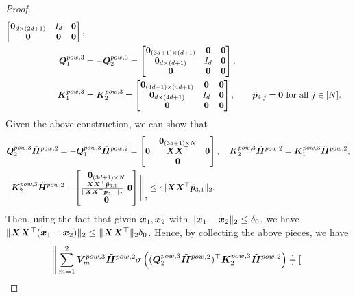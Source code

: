 \begin{proof}
\begin{align*}
\begin{bmatrix}
            \boldsymbol{0}_{d\times(2d+1)}&I_d&\boldsymbol{0}\\
            \boldsymbol{0}&\boldsymbol{0}&\boldsymbol{0}
        \end{bmatrix},\\
        \boldsymbol{Q}_1^{pow,3}&=-\boldsymbol{Q}_2^{pow,3}=\begin{bmatrix}
           \boldsymbol{0}_{(3d+1)\times (d+1)}&\boldsymbol{0}& \boldsymbol{0}\\
            \boldsymbol{0}_{d\times (d+1)}&I_d&\boldsymbol{0}\\
            \boldsymbol{0}&\boldsymbol{0}&\boldsymbol{0}
        \end{bmatrix},\\
        \boldsymbol{K}_1^{pow,3}&=\boldsymbol{K}_2^{pow,3}=\begin{bmatrix}
            \boldsymbol{0}_{(4d+1)\times(4d+1)}&\boldsymbol{0}&\boldsymbol{0}\\
            \boldsymbol{0}_{d\times(4d+1)}&I_d&\boldsymbol{0}\\
            \boldsymbol{0}&\boldsymbol{0}&\boldsymbol{0}
        \end{bmatrix},\qquad\tilde{\boldsymbol{p}}_{4,j} = \boldsymbol{0}\text{ for all }j\in[N].
    \end{align*}
    Given the above construction, we can show that
    \begin{align*}
       &\boldsymbol{Q}_2^{pow,3}\tilde{\boldsymbol{H}}^{pow,2}=-\boldsymbol{Q}_1^{pow,3}\tilde{\boldsymbol{H}}^{pow,2}=\begin{bmatrix}
           &\boldsymbol{0}_{(3d+1)\times N}&\\
           \boldsymbol{0}_{}&\boldsymbol{X}\boldsymbol{X}^\top &\boldsymbol{0}\\
           &\boldsymbol{0}&
       \end{bmatrix},\quad \boldsymbol{K}_2^{pow,3}\tilde{\boldsymbol{H}}^{pow,2}=\boldsymbol{K}_1^{pow,3}\tilde{\boldsymbol{H}}^{pow,2},\\
       &\Bigg\Vert\boldsymbol{K}_2^{pow,3}\tilde{\boldsymbol{H}}^{pow,2}-\begin{bmatrix}
            \boldsymbol{0}_{(3d+1)\times N}\\
            \frac{\boldsymbol{X}\boldsymbol{X}^\top\tilde{\boldsymbol{p}}_{3,1}}{\Vert\boldsymbol{X}\boldsymbol{X}^\top\tilde{\boldsymbol{p}}_{3,1}\Vert_2},\boldsymbol{0}\\
            \boldsymbol{0}
        \end{bmatrix}\Bigg\Vert_{2}\leq\epsilon\Vert\boldsymbol{X}\boldsymbol{X}^\top\tilde{\boldsymbol{p}}_{3,1}\Vert_2.
    \end{align*}
    Then, using the fact that given $\boldsymbol{x}_1,\boldsymbol{x}_2$ with $\Vert\boldsymbol{x}_1-\boldsymbol{x}_2\Vert_2\leq\delta_0$, we have
$        \Vert\boldsymbol{X}\boldsymbol{X}^\top(\boldsymbol{x}_1-\boldsymbol{x}_2)\Vert_2\leq \Vert\boldsymbol{X}\boldsymbol{X}^\top\Vert_2\delta_0 $. 
    Hence, by collecting the above pieces, we have
    \begin{align*}
      \Bigg\Vert\sum_{m=1}^2\boldsymbol{V}_m^{pow,3}\tilde{\boldsymbol{H}}^{pow,2}\sigma\left((\boldsymbol{Q}_2^{pow,3}\tilde{\boldsymbol{H}}^{pow,2})^{\top}\boldsymbol{K}_2^{pow,3}\tilde{\boldsymbol{H}}^{pow,2}\right)&-\begin{bmatrix}

\end{bmatrix}
\end{align*}
\end{proof}
